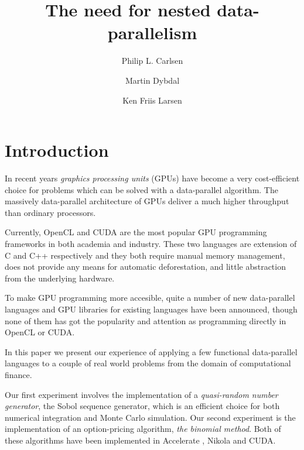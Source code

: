 \documentclass{llncs2e/llncs}
\title{The need for nested data-parallelism}
\author{Philip L. Carlsen \and Martin Dybdal \and Ken Friis Larsen}
\institute{University of Copenhagen \\ \email{plcplc@gmail.com,
    dybber@dybber.dk, kflarsen@diku.dk}}
\begin{document}
\maketitle

\section{Introduction}
In recent years \emph{graphics processing units} (GPUs) have become a
very cost-efficient choice for problems which can be solved with a
data-parallel algorithm. The massively data-parallel architecture of
GPUs deliver a much higher throughput than ordinary processors.

Currently, OpenCL and CUDA are the most popular GPU programming
frameworks in both academia and industry. These two languages are
extension of C and C++ respectively and they both require manual
memory management, does not provide any means for automatic
deforestation, and little abstraction from the underlying
hardware.

To make GPU programming more accesible, quite a number of new
data-parallel languages and GPU libraries for existing languages
\cite{Catanzaro2011, chakravarty2011accelerating, mainland2010nikola,
  svensson2011obsidian, bergstra2010theano, homepage:rgpu,
  bergstrom2012nested} have been announced, though none of them has
got the popularity and attention as programming directly in OpenCL or
CUDA.

In this paper we present our experience of applying a few functional
data-parallel languages to a couple of real world problems from the
domain of computational finance.

Our first experiment involves the implementation of a
\emph{quasi-random number generator}, the Sobol sequence generator,
which is an efficient choice for both numerical integration and Monte
Carlo simulation. Our second experiment is the implementation of an
option-pricing algorithm, \emph{the binomial method}. Both of these
algorithms have been implemented in Accelerate
\cite{chakravarty2011accelerating}, Nikola \cite{mainland2010nikola}
and CUDA.
\newpage


\end{document}
